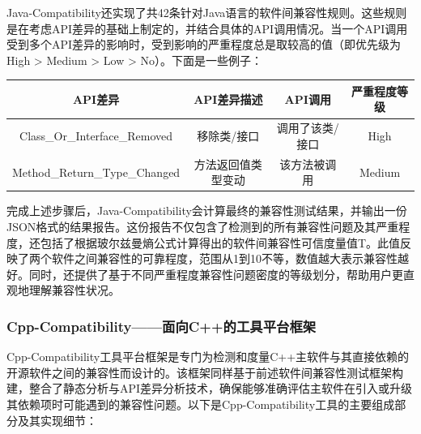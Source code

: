 \documentclass{article}
\begin{document}
Java-Compatibility还实现了共42条针对Java语言的软件间兼容性规则。这些规则是在考虑API差异的基础上制定的，并结合具体的API调用情况。当一个API调用受到多个API差异的影响时，受到影响的严重程度总是取较高的值（即优先级为 High > Medium > Low > No）。下面是一些例子：

\begin{center}
	\begin{tabular}{|c|c|c|c|}
		\hline
		\textbf{API差异} & \textbf{API差异描述} & \textbf{API调用} & \textbf{严重程度等级} \\
		\hline
		Class\_Or\_Interface\_Removed & 移除类/接口 & 调用了该类/接口 & High \\
		\hline
		Method\_Return\_Type\_Changed & 方法返回值类型变动 & 该方法被调用 & Medium \\
		\hline
	\end{tabular}
\end{center}

完成上述步骤后，Java-Compatibility会计算最终的兼容性测试结果，并输出一份JSON格式的结果报告。这份报告不仅包含了检测到的所有兼容性问题及其严重程度，还包括了根据玻尔兹曼熵公式计算得出的软件间兼容性可信度量值T。此值反映了两个软件之间兼容性的可靠程度，范围从1到10不等，数值越大表示兼容性越好。同时，还提供了基于不同严重程度兼容性问题密度的等级划分，帮助用户更直观地理解兼容性状况。

\subsubsection{Cpp-Compatibility——面向C++的工具平台框架}

Cpp-Compatibility工具平台框架是专门为检测和度量C++主软件与其直接依赖的开源软件之间的兼容性而设计的。该框架同样基于前述软件间兼容性测试框架构建，整合了静态分析与API差异分析技术，确保能够准确评估主软件在引入或升级其依赖项时可能遇到的兼容性问题。以下是Cpp-Compatibility工具的主要组成部分及其实现细节：
\end{document}
